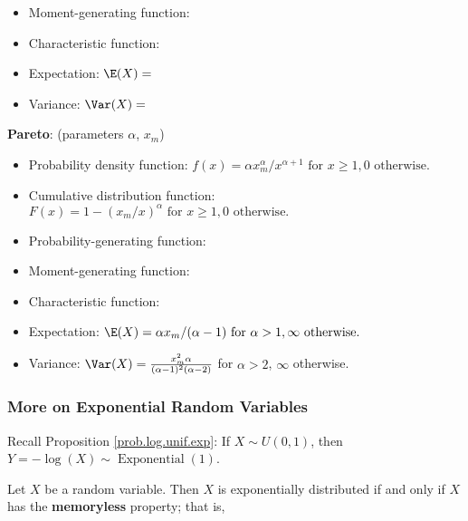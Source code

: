 \begin{itemize}
\begin{itemize}
\item Moment-generating function:

\item Characteristic function:

\item Expectation: \(\E(X) = \)

\item Variance: \(\Var(X) = \)

\end{itemize}

\textbf{Pareto}: (parameters \(\alpha\), \(x_m\))

\begin{itemize}

\item Probability density function: \(f(x) = \alpha x_m^\alpha/x^{\alpha + 1} \text{ for } x \geq 1, 0 \text{ otherwise.} \)

\item Cumulative distribution function: \(F(x) = 1 - (x_m/x)^{\alpha} \text{ for } x \geq 1, 0 \text{ otherwise.}\)

\item Probability-generating function:

\item Moment-generating function:

\item Characteristic function:

\item Expectation: \(\E(X) = \alpha x_m/(\alpha -1) \text{ for } \alpha > 1, \infty \text{ otherwise.}\)

\item Variance: \(\Var(X) = \frac{x_m^2\alpha}{(\alpha-1)^2(\alpha - 2)}\) for \(\alpha > 2\), \(\infty\) otherwise.

\end{itemize}

\subsubsection{More on Exponential Random Variables}\label{prob.exp.rand.vars}

\begin{remark}
Recall Proposition \ref{prob.log.unif.exp}: If \(X \sim U(0, 1)\), then \(Y = - \log(X) \sim \operatorname{Exponential}(1)\). 
\end{remark}

\begin{proposition}\label{prob.exp.memoryless} Let \(X\) be a random variable. Then \(X\) is exponentially distributed if and only if \(X\) has the \textbf{memoryless} property; that is,


\end{proposition}
\end{itemize}
